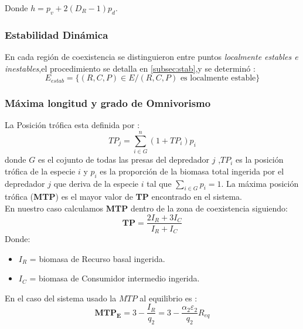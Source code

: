 Donde $ h = p_v + 2(D_R -1) p_d$.



\subsubsection{Estabilidad Din\'amica}
En cada regi\'on de coexistencia se distinguieron entre puntos \emph{localmente estables e inestables},el procedimiento se detalla en \ref{subsec:stab},y se determin\'o :
\begin{equation}\label{eq:estabreg}
E_{estab} = \{ (R,C,P) \in E / (R,C,P) \mbox{ es localmente estable} \}
\end{equation}

\subsubsection{M\'axima longitud y grado de Omnivorismo}
La Posici\'on tr\'ofica esta definida por \citep{TP2007proximate}:
\begin{equation} TP_j = \sum_{i \in G}^n (1+TP_i) p_i  \end{equation} donde $G$ es el cojunto de todas las presas del depredador $j$ ,$TP_i$ es la posici\'on tr\'ofica de la especie $i$ y $p_i$ es la proporci\'on de la biomasa total ingerida por el depredador $j$ que deriva de la especie $i$ tal que $ \sum_{i \in G} p_i =1 $.
La m\'axima posici\'on tr\'ofica (\textbf{MTP}) es el mayor valor de \textbf{TP} encontrado en el sistema.\\


En nuestro caso calculamos \textbf{MTP} dentro de la zona de coexistencia siguiendo:
\begin{equation} \mathbf{TP}= \frac{2 I_R + 3 I_C}{I_R+I_C} \end{equation}
Donde:
\begin{itemize}
\item $I_R$ = biomasa de Recurso basal ingerida.
\item $I_C$ = biomasa de Consumidor intermedio ingerida.
\end{itemize}
En el caso del sistema usado la $MTP$ al equilibrio es :
\begin{equation}
  \mathbf{MTP_E} = 3 - \frac{I_R}{q_2} = 3 - \frac{\alpha_2 \varepsilon_2}{q_2} R_{eq}
\end{equation}

